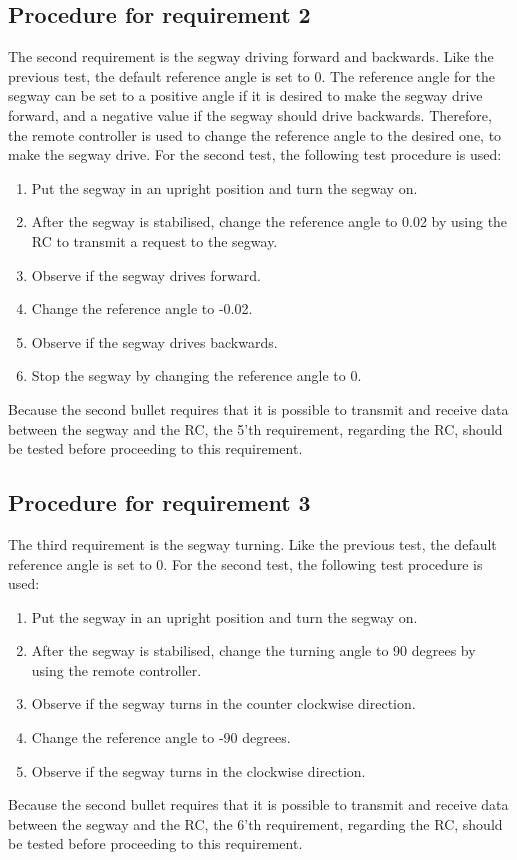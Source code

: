 \subsection{Procedure for requirement 2}
The second requirement is the segway driving forward and backwards. Like the previous test, the default reference angle is set to 0. The reference angle for the segway can be set to a positive angle if it is desired to make the segway drive forward, and a negative value if the segway should drive backwards. Therefore, the remote controller is used to change the reference angle to the desired one, to make the segway drive. For the second test, the following test procedure is used:
\begin{enumerate}
\item Put the segway in an upright position and turn the segway on.
\item After the segway is stabilised, change the reference angle to 0.02 by using the RC to transmit a request to the segway. 
\item Observe if the segway drives forward.
\item Change the reference angle to -0.02.
\item Observe if the segway drives backwards.
\item Stop the segway by changing the reference angle to 0.
\end{enumerate}
Because the second bullet requires that it is possible to transmit and receive data between the segway and the RC, the 5'th requirement, regarding the RC, should be tested before proceeding to this requirement.

\subsection{Procedure for requirement 3}
The third requirement is the segway turning. Like the previous test, the default reference angle is set to 0. For the second test, the following test procedure is used:
\begin{enumerate}
\item Put the segway in an upright position and turn the segway on.
\item After the segway is stabilised, change the turning angle to 90 degrees by using the remote controller.
\item Observe if the segway turns in the counter clockwise direction.
\item Change the reference angle to -90 degrees.
\item Observe if the segway turns in the clockwise direction.
\end{enumerate}
Because the second bullet requires that it is possible to transmit and receive data between the segway and the RC, the 6'th requirement, regarding the RC, should be tested before proceeding to this requirement.


